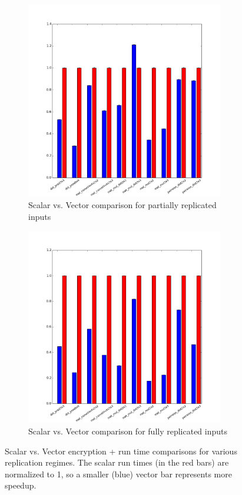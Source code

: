\begin{figure}
\begin{subfigure}{0.3\textwidth}
        \includegraphics[width=0.95\textwidth]{figures/graphs/DataPartiallyReplicatedENC+RUN.png}
        \caption{Scalar vs. Vector comparison for partially replicated inputs}\label{fig:ml-kernels-part-repl}
    \end{subfigure}
    \begin{subfigure}{0.3\textwidth}
        \includegraphics[width=0.95\textwidth]{figures/graphs/DataReplicatedENC+RUN.png}
        \caption{Scalar vs. Vector comparison for fully replicated inputs}\label{fig:ml-kernels-repl}
    \end{subfigure}
    \caption{Scalar vs. Vector encryption + run time comparisons for various replication regimes. The scalar run times (in the red bars) are normalized to 1, so a smaller (blue) vector bar represents more speedup.}\label{fig:ml-kernels}
\end{figure}

